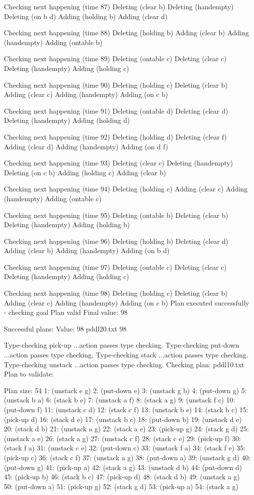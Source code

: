 Checking next happening (time 87)
Deleting (clear b)
Deleting (handempty)
Deleting (on b d)
Adding (holding b)
Adding (clear d)

Checking next happening (time 88)
Deleting (holding b)
Adding (clear b)
Adding (handempty)
Adding (ontable b)

Checking next happening (time 89)
Deleting (ontable c)
Deleting (clear c)
Deleting (handempty)
Adding (holding c)

Checking next happening (time 90)
Deleting (holding c)
Deleting (clear b)
Adding (clear c)
Adding (handempty)
Adding (on c b)

Checking next happening (time 91)
Deleting (ontable d)
Deleting (clear d)
Deleting (handempty)
Adding (holding d)

Checking next happening (time 92)
Deleting (holding d)
Deleting (clear f)
Adding (clear d)
Adding (handempty)
Adding (on d f)

Checking next happening (time 93)
Deleting (clear c)
Deleting (handempty)
Deleting (on c b)
Adding (holding c)
Adding (clear b)

Checking next happening (time 94)
Deleting (holding c)
Adding (clear c)
Adding (handempty)
Adding (ontable c)

Checking next happening (time 95)
Deleting (ontable b)
Deleting (clear b)
Deleting (handempty)
Adding (holding b)

Checking next happening (time 96)
Deleting (holding b)
Deleting (clear d)
Adding (clear b)
Adding (handempty)
Adding (on b d)

Checking next happening (time 97)
Deleting (ontable c)
Deleting (clear c)
Deleting (handempty)
Adding (holding c)

Checking next happening (time 98)
Deleting (holding c)
Deleting (clear b)
Adding (clear c)
Adding (handempty)
Adding (on c b)
Plan executed successfully - checking goal
Plan valid
Final value: 98 

Successful plans:
Value: 98
 pddl20.txt 98 

Type-checking pick-up
...action passes type checking.
Type-checking put-down
...action passes type checking.
Type-checking stack
...action passes type checking.
Type-checking unstack
...action passes type checking.
Checking plan: pddl10.txt
Plan to validate:

Plan size: 54
1:
(unstack e g) 
2:
(put-down e) 
3:
(unstack g b) 
4:
(put-down g) 
5:
(unstack b a) 
6:
(stack b e) 
7:
(unstack a f) 
8:
(stack a g) 
9:
(unstack f c) 
10:
(put-down f) 
11:
(unstack c d) 
12:
(stack c f) 
13:
(unstack b e) 
14:
(stack b c) 
15:
(pick-up d) 
16:
(stack d e) 
17:
(unstack b c) 
18:
(put-down b) 
19:
(unstack d e) 
20:
(stack d b) 
21:
(unstack a g) 
22:
(stack a e) 
23:
(pick-up g) 
24:
(stack g d) 
25:
(unstack a e) 
26:
(stack a g) 
27:
(unstack c f) 
28:
(stack c e) 
29:
(pick-up f) 
30:
(stack f a) 
31:
(unstack c e) 
32:
(put-down c) 
33:
(unstack f a) 
34:
(stack f e) 
35:
(pick-up c) 
36:
(stack c f) 
37:
(unstack a g) 
38:
(put-down a) 
39:
(unstack g d) 
40:
(put-down g) 
41:
(pick-up a) 
42:
(stack a g) 
43:
(unstack d b) 
44:
(put-down d) 
45:
(pick-up b) 
46:
(stack b c) 
47:
(pick-up d) 
48:
(stack d b) 
49:
(unstack a g) 
50:
(put-down a) 
51:
(pick-up g) 
52:
(stack g d) 
53:
(pick-up a) 
54:
(stack a g) 

